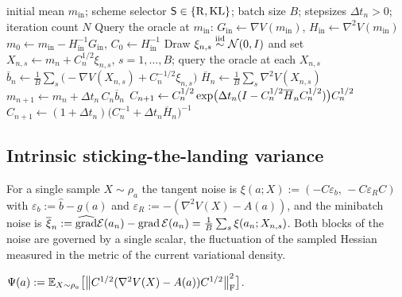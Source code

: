 \begin{algorithm}[t]
\caption{Quadratic-rescued minibatch Price/Hessian STL Fisher--Rao scheme}
\label{alg:unified}
\begin{algorithmic}[1]
\Require initial mean $m_{\mathrm{in}}$; scheme selector $\mathsf S\in\{\mathrm{R},\mathrm{KL}\}$; batch size $B$;
stepsizes $\Delta t_n>0$; iteration count $N$
\State {}
\State Query the oracle at $m_{\mathrm{in}}$: $G_{\mathrm{in}}\gets\nabla V(m_{\mathrm{in}})$,
$H_{\mathrm{in}}\gets\nabla^2V(m_{\mathrm{in}})$
\State $m_0\gets m_{\mathrm{in}}-H_{\mathrm{in}}^{-1}G_{\mathrm{in}}$,\quad
$C_0\gets H_{\mathrm{in}}^{-1}$
\State {}
    \State Draw $\xi_{n,s}\overset{\text{iid}}{\sim}\mathcal{N}(0,I)$ and set
    $X_{n,s}\gets m_n+C_n^{1/2}\xi_{n,s}$, $s=1,\dots,B$; query the oracle at each $X_{n,s}$
    \State $\overline b_n\gets\frac1B\sum_s\bigl(-\nabla V(X_{n,s})+C_n^{-1/2}\xi_{n,s}\bigr)$
    \State $\overline H_n\gets\frac1B\sum_s\nabla^2V(X_{n,s})$
    \State $m_{n+1}\gets m_n+\Delta t_n\,C_n\overline b_n$
        \State $C_{n+1}\gets C_n^{1/2}\exp\bigl(\Delta t_n(I-C_n^{1/2}\overline H_nC_n^{1/2})\bigr)C_n^{1/2}$
    \Else
        \State $C_{n+1}\gets(1+\Delta t_n)\bigl(C_n^{-1}+\Delta t_n\overline H_n\bigr)^{-1}$
    \EndIf
\EndFor
\end{algorithmic}
\end{algorithm}

\subsection{Intrinsic sticking-the-landing variance}
\label{subsec:stoch-variance}

For a single sample $X\sim\rho_a$ the tangent noise is $\xi(a;X):=(-C\varepsilon_b,\,-C\varepsilon_RC)$
with $\varepsilon_b:=\widehat b-g(a)$ and $\varepsilon_R:=-(\nabla^2V(X)-A(a))$, and the minibatch noise
is $\overline\xi_n:=\widehat{\operatorname{grad}}\mathcal{E}(a_n)-\operatorname{grad}\mathcal{E}(a_n)=\tfrac1B\sum_s\xi(a_n;X_{n,s})$. Both blocks
of the noise are governed by a single scalar, the fluctuation of the sampled Hessian measured in the
metric of the current variational density.

\begin{definition}
\label{def:Psi}
$\Psi(a):=\mathbb{E}_{X\sim\rho_a}\bigl[\left\lVert C^{1/2}(\nabla^2V(X)-A(a))C^{1/2}\right\rVert_{\mathrm{F}}^2\bigr]$.
\end{definition}

